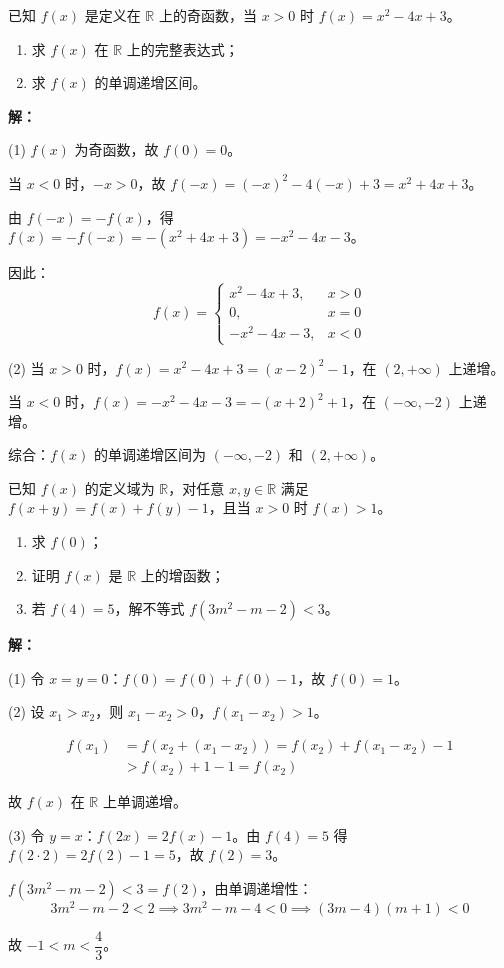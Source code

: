 \documentclass[12pt,a4paper]{ctexart}
\begin{document}
\begin{examplebox}[例5]
已知 $f(x)$ 是定义在 $\mathbb{R}$ 上的奇函数，当 $x>0$ 时 $f(x)=x^2-4x+3$。
\begin{enumerate}[label=(\arabic*)]
  \item 求 $f(x)$ 在 $\mathbb{R}$ 上的完整表达式；
  \item 求 $f(x)$ 的单调递增区间。
\end{enumerate}

\medskip
\textbf{解：}

(1) $f(x)$ 为奇函数，故 $f(0)=0$。

当 $x<0$ 时，$-x>0$，故 $f(-x)=(-x)^2-4(-x)+3=x^2+4x+3$。

由 $f(-x)=-f(x)$，得 $f(x)=-f(-x)=-(x^2+4x+3)=-x^2-4x-3$。

因此：
\[f(x)=\begin{cases} x^2-4x+3, & x>0 \\ 0, & x=0 \\ -x^2-4x-3, & x<0 \end{cases}\]

(2) 当 $x>0$ 时，$f(x)=x^2-4x+3=(x-2)^2-1$，在 $(2,+\infty)$ 上递增。

当 $x<0$ 时，$f(x)=-x^2-4x-3=-(x+2)^2+1$，在 $(-\infty,-2)$ 上递增。

综合：$f(x)$ 的单调递增区间为 $\boxed{(-\infty,-2)}$ 和 $\boxed{(2,+\infty)}$。
\end{examplebox}

\begin{examplebox}[例6]
已知 $f(x)$ 的定义域为 $\mathbb{R}$，对任意 $x,y\in\mathbb{R}$ 满足 $f(x+y)=f(x)+f(y)-1$，且当 $x>0$ 时 $f(x)>1$。
\begin{enumerate}[label=(\arabic*)]
  \item 求 $f(0)$；
  \item 证明 $f(x)$ 是 $\mathbb{R}$ 上的增函数；
  \item 若 $f(4)=5$，解不等式 $f(3m^2-m-2)<3$。
\end{enumerate}

\medskip
\textbf{解：}

(1) 令 $x=y=0$：$f(0)=f(0)+f(0)-1$，故 $f(0)=1$。

(2) 设 $x_1>x_2$，则 $x_1-x_2>0$，$f(x_1-x_2)>1$。

\begin{align*}
f(x_1)&=f(x_2+(x_1-x_2))=f(x_2)+f(x_1-x_2)-1\\
&>f(x_2)+1-1=f(x_2)
\end{align*}

故 $f(x)$ 在 $\mathbb{R}$ 上单调递增。

(3) 令 $y=x$：$f(2x)=2f(x)-1$。由 $f(4)=5$ 得 $f(2\cdot2)=2f(2)-1=5$，故 $f(2)=3$。

$f(3m^2-m-2)<3=f(2)$，由单调递增性：
\[3m^2-m-2<2\implies 3m^2-m-4<0\implies(3m-4)(m+1)<0\]

故 $\boxed{-1<m<\dfrac{4}{3}}$。
\end{examplebox}
\end{document}
